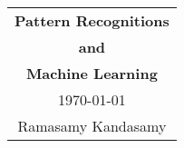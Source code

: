 



\raggedright
\footnotesize
\begin{multicols*}{3}
\setlength{\premulticols}{1pt}
\setlength{\postmulticols}{1pt}
\setlength{\multicolsep}{1pt}
\setlength{\columnsep}{2pt}

\begin{center}
\begin{tabular}{c}
\LARGE{\textbf{Pattern Recognitions}}\\
\LARGE{\textbf{and}}\\
\LARGE{\textbf{Machine Learning}}\\
\today\\
Ramasamy Kandasamy\\
\end{tabular}
\end{center}





\end{multicols*}
